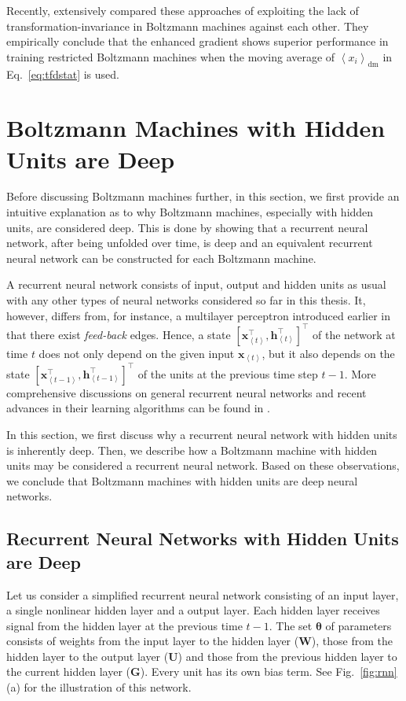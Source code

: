 \documentclass{now}
\newcommand{\qt}[1]{\left<#1\right>}
\newcommand{\vect}[1]{\mathbf{#1}}
\newcommand{\vects}[1]{\boldsymbol{#1}}
\newcommand{\matr}[1]{\mathbf{#1}}
\newcommand{\vh}[0]{\vect{h}}
\newcommand{\vx}[0]{\vect{x}}
\newcommand{\mW}[0]{\matr{W}}
\newcommand{\mG}[0]{\matr{G}}
\newcommand{\mU}[0]{\matr{U}}
\newcommand{\tdf}[0]{\text{dm}}
\newcommand{\TT}[0]{{\vects{\theta}}}
\begin{document}
Recently, \citet{Melchior2013} extensively compared these approaches of
exploiting the lack of transformation-invariance in Boltzmann machines against
each other. They empirically conclude that the enhanced gradient shows superior
performance in training restricted Boltzmann machines when the moving average of
$\left< x_i \right>_{\tdf}$ in Eq.~\eqref{eq:tfdstat} is used. 

\section{Boltzmann Machines with Hidden Units are Deep}

Before discussing Boltzmann machines further, in this section, we first provide
an intuitive explanation as to why Boltzmann machines, especially with hidden
units, are considered deep. This is done by showing that a recurrent neural
network, after being unfolded over time, is deep and an equivalent recurrent
neural network can be constructed for each Boltzmann machine.

A recurrent neural network consists of input, output and hidden units as usual
with any other types of neural networks considered so far in this thesis. It,
however, differs from, for instance, a multilayer perceptron introduced earlier
in that there exist \textit{feed-back} edges. Hence, a state $\left[
\vx^\top_{\qt{t}}, \vh^\top_{\qt{t}}\right]^\top$ of the network at time $t$
does not only depend on the given input $\vx_{\qt{t}}$, but it also depends on
the state $\left[ \vx^\top_{\qt{t-1}}, \vh^\top_{\qt{t-1}}\right]^\top$ of the
units at the previous time step $t-1$. More comprehensive discussions on general
recurrent neural networks and recent advances in their learning algorithms can
be found in \citep[][]{Bengio2013rec,Sutskever2013,Graves2013,Pascanu2013}.

In this section, we first discuss why a recurrent neural network with hidden
units is inherently deep. Then, we describe how a Boltzmann machine with hidden
units may be considered a recurrent neural network. Based on these observations,
we conclude that Boltzmann machines with hidden units are deep neural networks.

\subsection{Recurrent Neural Networks with Hidden Units are Deep}
\label{sec:rnn_deep}

Let us consider a simplified recurrent neural network consisting of an input
layer, a single nonlinear hidden layer and a output layer. Each hidden layer
receives signal from the hidden layer at the previous time $t-1$. The set $\TT$
of parameters consists of weights from the input layer to the hidden layer
($\mW$), those from the hidden layer to the output layer ($\mU$) and those from
the previous hidden layer to the current hidden layer ($\mG$).  Every unit has
its own bias term. See Fig.~\ref{fig:rnn} (a) for the illustration of this
network.
\end{document}
